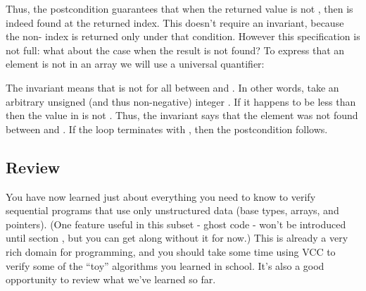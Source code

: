 {{\noindent
Thus, the postcondition guarantees that when the returned value
is not , then  is indeed found at the returned
index.
This doesn't require an invariant, because the non- index
is returned only under that condition.
However this specification is not full: what about the case when the result is not found?
To express that an element is not in an array we will use a universal quantifier:


\noindent
The invariant  means that 
 is not  for all  between  and .
In other words, take an arbitrary unsigned (and thus non-negative) integer . 
If it happens to be less than  then the value in  is not .
Thus, the invariant says that the element was not found between 
and .
If the loop terminates with , then the postcondition follows.


\subsection{Review}
You have now learned just about everything you need to know to verify
sequential programs that use only unstructured data (base types,
arrays, and pointers). (One feature useful in this subset - ghost code
- won't be introduced until section \secref{}, but you can get along
without it for now.) This is already a very rich domain for
programming, and you should take some time using VCC to verify some
of the ``toy'' algorithms you learned in school. It's also a good
opportunity to review what we've learned so far.

}}
